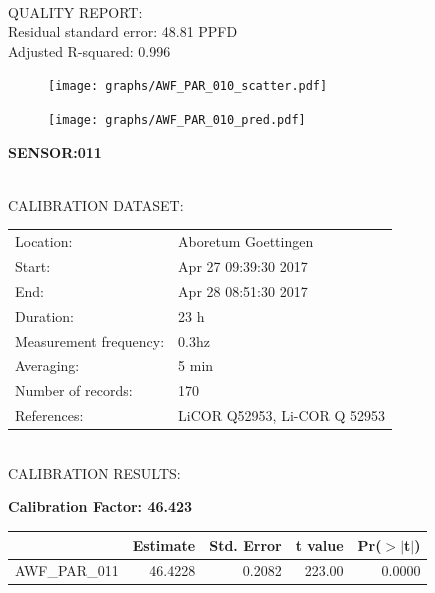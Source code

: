 \documentclass[oneside]{report}
\begin{document}
\hrulefill\\
QUALITY REPORT:\\
Residual standard error: 48.81 PPFD\\
Adjusted R-squared: 0.996



\begin{figure}[H]
  \centering
  \texttt{[image: graphs/AWF\_PAR\_010\_scatter.pdf]}
\end{figure}




\begin{figure}[H]
  \centering
  \texttt{[image: graphs/AWF\_PAR\_010\_pred.pdf]}
\end{figure}

\pagebreak


\begin{center}
\large{\textbf{SENSOR:011}}\\
\end{center}

\hrulefill\\
CALIBRATION DATASET:\\
\begin{table}[h!]
  \centering
  \label{tab:table1}
  \begin{tabular}{ll}
    Location: & Aboretum Goettingen\\ 
    
    
    Start:  & Apr 27 09:39:30 2017 \\
    End:   & Apr 28 08:51:30 2017\\ 
    Duration: & 23 h\\
    Measurement frequency: & 0.3hz\\
    Averaging:  &5 min\\
    Number of records: & 170 \\
    References: & LiCOR Q52953, Li-COR Q 52953 \\
  \end{tabular}
\end{table}

\hrulefill\\
CALIBRATION RESULTS:\\


\begin{center}
\textbf{\large{Calibration Factor: 46.423}}\\
\end{center}
\begin{table}[ht]
\centering
\begin{tabular}{rrrrr}
  \hline
 & Estimate & Std. Error & t value & Pr($>$$|$t$|$) \\ 
  \hline
AWF\_PAR\_011 & 46.4228 & 0.2082 & 223.00 & 0.0000 \\ 
   \hline
\end{tabular}
\end{table}
\end{document}

